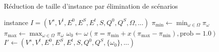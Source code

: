 \documentclass[a4paper,12pt]{article}
\begin{document}
\begin{algorithm}
    \scriptsize
    \caption{Réduction de taille d'instance par élimination de scénarios}
    \begin{algorithmic}[1]
        \Require instance $I = (V^s, V^t, E^0, E^S, E^t, S, Q^0, Q^S, \Omega, ...)$ 
        \State $\pi_{\min} \gets \min_{\omega \in \Omega} \pi_\omega$ 
        \State $\pi_{\max} \gets \max_{\omega \in \Omega} \pi_\omega$ 
        \State $\omega_0 \gets \omega(\pi = \pi_{\min} + x(\pi_{\max} - \pi_{\min}),\text{prob} = 1.0)$  \\
        \Return $I' \gets (V^s, V^t, E^0, E^S, E^t, S, Q^0, Q^S, \lbrace \omega_0 \rbrace, ...)$ 

    \end{algorithmic}
\end{algorithm}
\end{document}
